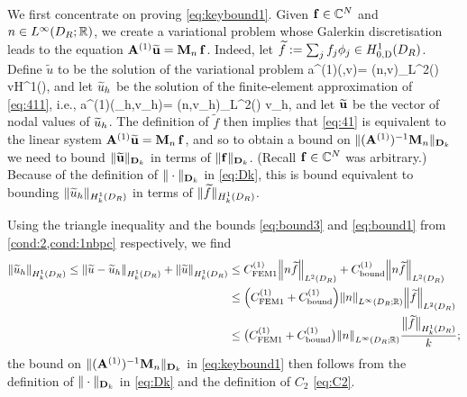 \

We first concentrate on proving \cref{eq:keybound1}.
Given $\mathbf{f} \in \mathbb C^N$ and $n\in \LiDRRR$, we create a variational problem whose Galerkin discretisation leads to the equation $\mathbf{A}^{(1)} \widetilde{\mathbf{u}} = \mathbf{M}_n\,\mathbf{f}$.
Indeed, let $\widetilde{f} := \sum_j f_j \phi_j\in \HozDDR$. Define $\widetilde{u}$ to be the solution of the variational problem 
\beq\label{eq:411}
a^{(1)}(,v)= (n,v)_{L^2(\Omega)} \quad{} v\in H^1(\Omega),
\eeq
and let $\widetilde{u}_h$ be the solution of the finite-element approximation of \cref{eq:411}, i.e.,
\beq\label{eq:41}
a^{(1)}(\tu_h,v_h)= (n,v_h)_{L^2(\Omega)} \quad{} v_h\in \Vhp,
\eeq
and let $\widetilde{\mathbf{u}}$ be the vector of nodal values of $\widetilde{u}_h$. The definition of $\widetilde{f}$ then implies that \cref{eq:41} is equivalent to the linear system $\mathbf{A}^{(1)} \widetilde{\mathbf{u}} = \mathbf{M}_{n}\,\mathbf{f}$, and so to obtain a bound on $\|(\mathbf{A}^{(1)})^{-1}\mathbf{M}_n\|_{\mathbf{D}_k}$ we need to bound $\|\widetilde{\mathbf{u}}\|_{\mathbf{D}_k}$ in terms of $\|\mathbf{f}\|_{\mathbf{D}_k}$. (Recall $\mathbf{f} \in \mathbb C^{N}$ was arbitrary.) Because of the definition 
of $\|\cdot\|_{\mathbf{D}_k}$ in \cref{eq:Dk}, this is bound equivalent to bounding $\|\tu_h\|_{\HokDR}$ in terms of $\|\widetilde{f}\|_{\HokDR}$.


Using %
the triangle inequality and the bounds \cref{eq:bound3} and \cref{eq:bound1} from \cref{cond:2,cond:1nbpc} respectively, we find
\begin{align}
\N{\tu_h}_{\HokDR} \leq
\N{\tu-\tu_h}_{\HokDR} + \N{\tu}_{\HokDR} \label{eq:mainevent1}
& \leq C^{(1)}_{\rm FEM1}\NLtDR{n\ftilde} + C^{(1)}_{\rm bound}\NLtDR{n\ftilde} \\ 
& \leq \mleft(C^{(1)}_{\rm FEM1} + C^{(1)}_{\rm bound}\mright)\NLiDRRR{n}\NLtDR{\ftilde} \label{eq:mainevent1a} \\
& \leq\big(C^{(1)}_{\rm FEM1}+  C^{(1)}_{\rm bound}\big)\NLiDRRR{n}\frac{\big\|\widetilde{f}\big\|_{\HokDR}}{k};\nonumber
\end{align}
the bound on $\|(\mathbf{A}^{(1)})^{-1}\mathbf{M}_n\|_{\mathbf{D}_k}$ in \cref{eq:keybound1} then follows from the definition of $\|\cdot\|_{\mathbf{D}_k}$ in \cref{eq:Dk} and the definition of $C_2$ \cref{eq:C2}.

